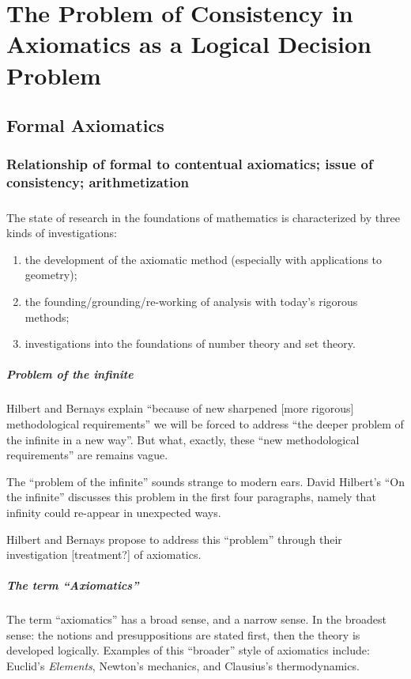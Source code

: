 \chapter[Problem of Consistency]{The Problem of Consistency in Axiomatics as a Logical Decision Problem}

\section{Formal Axiomatics}

\subsection{Relationship of formal to contentual axiomatics; issue of
  consistency; arithmetization}

\paragraph{} The state of research in the foundations of mathematics
is characterized by three kinds of investigations:
\begin{enumerate}
\item the development of the axiomatic method (especially with
  applications to geometry);
\item the founding/grounding/re-working of analysis with today's
  rigorous methods;
\item investigations into the foundations of number theory and set theory.
\end{enumerate}

\paragraph{Problem of the infinite} Hilbert and Bernays explain
``because of new sharpened [more rigorous] methodological
requirements'' we will be forced to address ``the deeper problem of
the infinite in a new way''. But what, exactly, these ``new
methodological requirements'' are remains vague.

The ``problem of the infinite'' sounds strange to modern ears. David
Hilbert's ``On the infinite'' discusses this problem in the first four
paragraphs, namely that infinity could re-appear in unexpected ways.

Hilbert and Bernays propose to address this ``problem'' through their
investigation [treatment?] of axiomatics.

\paragraph{The term ``Axiomatics''}
The term ``axiomatics'' has a broad sense, and a narrow sense.
In the broadest sense: the notions and presuppositions are stated
first, then the theory is developed logically. Examples of this
``broader'' style of axiomatics include: Euclid's \textit{Elements},
Newton's mechanics, and Clausius's thermodynamics.

